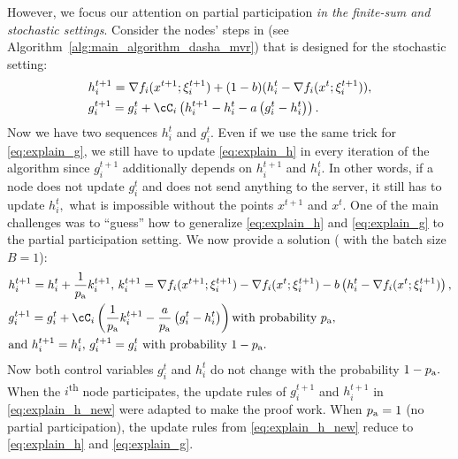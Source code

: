 \documentclass{article}
\newcommand{\algorithmname}{DASHA-PP}
\newcommand*{\probavailable}{\ensuremath{p_{\textnormal{a}}}}
\begin{document}
However, we focus our attention on partial participation \emph{in the finite-sum and stochastic settings}. Consider the nodes' steps in  \citep{tyurin2022dasha} (see Algorithm~\ref{alg:main_algorithm_dasha_mvr}) that is designed for the stochastic setting:
\begin{align}
  &h^{t+1}_i = \nabla f_i(x^{t+1};\xi^{t+1}_{i}) + (1 - b) (h^t_i - \nabla f_i(x^{t};\xi^{t+1}_{i})), \label{eq:explain_h}\\
  &g^{t+1}_i = g^{t}_i + \cC_i\left(h^{t+1}_i - h^{t}_i - a \left(g^{t}_i - h^{t}_i\right)\right). \label{eq:explain_g}
\end{align}
Now we have two sequences $h^{t}_i$ and $g^{t}_i.$ Even if we use the same trick for \eqref{eq:explain_g}, we still have to update \eqref{eq:explain_h} in every iteration of the algorithm since $g^{t+1}_i$ additionally depends on $h^{t+1}_i$ and $h^{t}_i.$ In other words, if a node does not update $g_i^{t}$ and does not send anything to the server, it still has to update $h^{t}_i,$ what is impossible without the points $x^{t+1}$ and $x^{t}.$
One of the main challenges was to ``guess'' how to generalize \eqref{eq:explain_h} and \eqref{eq:explain_g} to the partial participation setting. We now provide a solution (\algname{\algorithmname-MVR} with the batch size $B = 1$):
\begin{eqnarray}
\begin{aligned}
  & h^{t+1}_i = h^t_i + \frac{1}{\probavailable}k^{t+1}_i, \,k^{t+1}_i = \nabla f_i(x^{t+1};\xi^{t+1}_{i}) - \nabla f_i(x^{t};\xi^{t+1}_{i}) - b \left(h^t_i - \nabla f_i(x^{t};\xi^{t+1}_{i})\right), \label{eq:explain_h_new}\\
  & g^{t+1}_i = g^{t}_i + \cC_i\left(\frac{1}{\probavailable}k^{t+1}_i - \frac{a}{\probavailable} \left(g^{t}_i - h^{t}_i\right)\right) \textnormal{with probability } \probavailable, \\
  & \textnormal{and } h^{t+1}_i = h^{t}_i,\, g^{t+1}_i = g^{t}_i \textnormal{ with probability } 1 - \probavailable.
\end{aligned}
\end{eqnarray}
Now both control variables $g_i^{t}$ and $h_i^{t}$ do not change with the probability $1 - \probavailable.$ When the $i$\textsuperscript{th} node participates, the update rules of $g_i^{t+1}$ and $h_i^{t+1}$ in \eqref{eq:explain_h_new} were adapted to make the proof work. When $\probavailable = 1$ (no partial participation), the update rules from \eqref{eq:explain_h_new} reduce to \eqref{eq:explain_h} and \eqref{eq:explain_g}.
\end{document}
